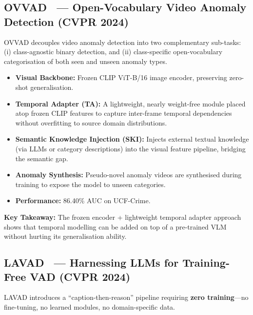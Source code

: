 \subsection{OVVAD~\cite{wu2024ovvad} — Open-Vocabulary Video Anomaly Detection (CVPR 2024)}

OVVAD decouples video anomaly detection into two complementary sub-tasks: (i) class-agnostic binary detection, and (ii) class-specific open-vocabulary categorisation of both seen and unseen anomaly types.

\begin{itemize}[leftmargin=*]
    \item \textbf{Visual Backbone:} Frozen CLIP ViT-B/16 image encoder, preserving zero-shot generalisation.
    \item \textbf{Temporal Adapter (TA):} A lightweight, nearly weight-free module placed atop frozen CLIP features to capture inter-frame temporal dependencies without overfitting to source domain distributions.
    \item \textbf{Semantic Knowledge Injection (SKI):} Injects external textual knowledge (via LLMs or category descriptions) into the visual feature pipeline, bridging the semantic gap.
    \item \textbf{Anomaly Synthesis:} Pseudo-novel anomaly videos are synthesised during training to expose the model to unseen categories.
    \item \textbf{Performance:} 86.40\% AUC on UCF-Crime.
\end{itemize}

\textbf{Key Takeaway:} The frozen encoder + lightweight temporal adapter approach shows that temporal modelling can be added on top of a pre-trained VLM without hurting its generalisation ability.

\subsection{LAVAD~\cite{zanella2024lavad} — Harnessing LLMs for Training-Free VAD (CVPR 2024)}

LAVAD introduces a ``caption-then-reason'' pipeline requiring \textbf{zero training}---no fine-tuning, no learned modules, no domain-specific data.

